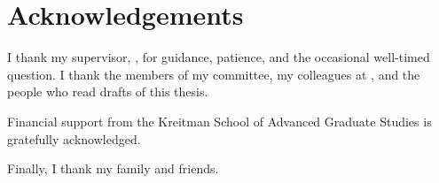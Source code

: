 \chapter*{Acknowledgements}

I thank my supervisor, \thesissupervisername, for guidance, patience, and the occasional well-timed question.
I thank the members of my committee, my colleagues at \thesisdepartment, and the people who read drafts of this thesis.

Financial support from the Kreitman School of Advanced Graduate Studies is gratefully acknowledged.

Finally, I thank my family and friends.
